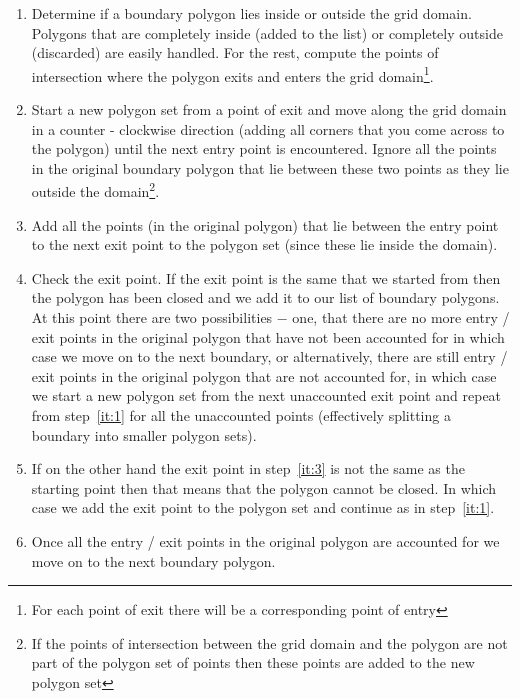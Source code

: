 \documentclass[12pt]{article}
\begin{document}
\renewcommand{\labelenumi}{Step~\theenumi:}
\begin{enumerate}
\item Determine if a boundary polygon lies inside or outside the grid domain. Polygons that are completely inside (added to the list) or completely outside (discarded) are easily handled. For the rest, compute the points of intersection where the polygon exits and enters the grid domain\footnote{For each point of exit there will be a corresponding point of entry}.
\item Start a new polygon set from a point of exit and move along the grid domain in a counter - clockwise direction (adding all corners that you come across to the polygon) until the next entry point is encountered. Ignore all the points in the  original boundary polygon that lie between these two points as they lie outside the domain\footnote{If the points of intersection between the grid domain and the polygon are not part of the polygon set of points then these points are added to the new polygon set}. \label{it:1}
\item Add all the points (in the original polygon) that lie between the entry point to the next exit point to the polygon set (since these lie inside the domain). \label{it:2}
\item Check the exit point. If the exit point is the same that we started from then the polygon has been closed and we add it to our list of boundary polygons. At this point there are two possibilities $-$ one, that there are no more entry / exit points in the original polygon that have not been accounted for in which case we move on to the next boundary, or alternatively, there are still entry / exit points in the original polygon that are not accounted for, in which case we start a new polygon set from the next unaccounted exit point and repeat from step~\ref{it:1} for all the unaccounted points (effectively splitting a boundary into smaller polygon sets). \label{it:3}
\item  If on the other hand the exit point in step~\ref{it:3} is not the same as the starting point then that means that the polygon cannot be closed. In which case we add the exit point to the polygon set and continue as in step~\ref{it:1}.
\item Once all the entry / exit points in the original polygon are accounted for we move on to the next boundary polygon.   
\end{enumerate}
\end{document}
